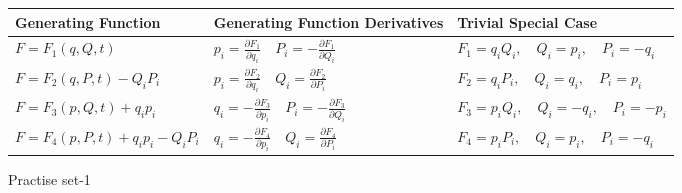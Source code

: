 	\begin{table}[H]
	\centering
	\renewcommand*{\arraystretch}{1.8}
	\begin{tabular}{|p{4.5cm}|p{5cm}|p{5.5cm}|}	
	\hline Generating Function&Generating Function Derivatives&Trivial Special Case\\
	\hline $F=F_{1}(q, Q, t)$&$p_{i}=\frac{\partial F_{1}}{\partial q_{i}} \quad P_{i}=-\frac{\partial F_{1}}{\partial Q_{i}}$&$F_{1}=q_{i} Q_{i}, \quad Q_{i}=p_{i}, \quad P_{i}=-q_{i}$\\
	\hline $F=F_{2}(q, P, t)-Q_{i} P_{i}$&$p_{i}=\frac{\partial F_{2}}{\partial q_{i}} \quad Q_{i}=\frac{\partial F_{2}}{\partial P_{i}}$&$F_{2}=q_{i} P_{i}, \quad Q_{i}=q_{i}, \quad P_{i}=p_{i}$\\
	\hline $F=F_{3}(p, Q, t)+q_{i} p_{i}$&$q_{i}=-\frac{\partial F_{3}}{\partial p_{i}} \quad P_{i}=-\frac{\partial F_{3}}{\partial Q_{i}}$&$F_{3}=p_{i} Q_{i}, \quad Q_{i}=-q_{i}, \quad P_{i}=-p_{i}$\\
	\hline $F=F_{4}(p, P, t)+q_{i} p_{i}-Q_{i} P_{i}$&$q_{i}=-\frac{\partial F_{4}}{\partial p_{i}} \quad Q_{i}=\frac{\partial F_{4}}{\partial P_{i}}$&$F_{4}=p_{i} P_{i}, \quad Q_{i}=p_{i}, \quad P_{i}=-q_{i}$\\\hline
	\end{tabular}
\end{table}
\newpage
\begin{abox}
	Practise set-1
\end{abox}
